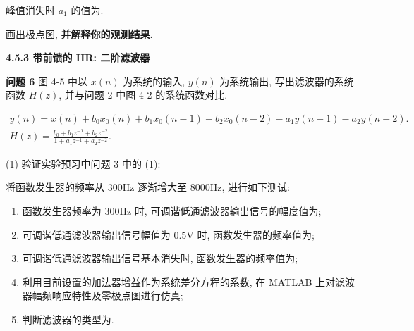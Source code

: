 \documentclass{dspreport}
\begin{document}
\begin{figure}[H]

\end{figure}

\begin{block}

\end{block}

\noindent 峰值消失时 $a_1$ 的值为\underline{\blank{  }}.

\noindent 画出极点图, \textbf{并解释你的观测结果.}

\begin{block}

\end{block}

\begin{figure}[H]

\end{figure}

\begin{block}

\end{block}

\noindent\textbf{4.5.3 带前馈的 IIR: 二阶滤波器}

\textbf{问题 6} 图 4-5 中以 $x(n)$ 为系统的输入, $y(n)$ 为系统输出, 写出滤波器的系统函数 $H(z)$, 并与问题 2 中图 4-2 的系统函数对比.

\begin{block}
    \begin{gather*}
        y(n)=x(n)+b_0x_0(n)+b_1x_0(n-1)+b_2x_0(n-2)-a_1y(n-1)-a_2y(n-2). \\
        H(z)=\frac{b_0+b_1z^{-1}+b_2z^{-2}}{1+a_1z^{-1}+a_2z^{-2}}.
    \end{gather*}
\end{block}

(1) 验证实验预习中问题 3 中的 (1):

将函数发生器的频率从 300Hz 逐渐增大至 8000Hz, 进行如下测试:
\begin{enumerate}[label=\textcircled{\arabic*}]
    \item 函数发生器频率为 300Hz 时, 可调谐低通滤波器输出信号的幅度值为\underline{};
    \item 可调谐低通滤波器输出信号幅值为 0.5V 时, 函数发生器的频率值为\underline{};
    \item 可调谐低通滤波器输出信号基本消失时, 函数发生器的频率值为\underline{};
    \item 利用目前设置的加法器增益作为系统差分方程的系数, 在 MATLAB 上对滤波器幅频响应特性及零极点图进行仿真;
    \item 判断滤波器的类型为\underline{}.
\end{enumerate}
\end{document}
